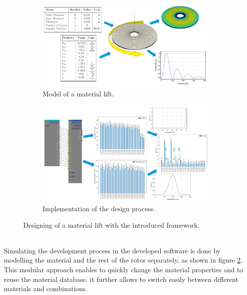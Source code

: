 \begin{figure}[h]
    \centering
    \begin{subfigure}[b]{0.95\textwidth}
        \centering
        \includegraphics[width=\textwidth]{pics/rotor_model.png}
        \caption{\label{pic:rotor_model} Model of a material lift.}
    \end{subfigure}
    \hfill
    \begin{subfigure}[b]{0.95\textwidth}
        \centering
        \includegraphics[width=\textwidth]{pics/rotor_solution.png}
        \caption{\label{pic:rotor_solution} Implementation of the design process.}
    \end{subfigure}
    \caption{\label{pic:rotor} Designing of a material lift with the introduced framework.}
\end{figure}\\
Simulating the development process in the developed software is done by 
modelling the material and the rest of the rotor separately, as shown in figure \ref{pic:rotor_solution}.
This modular approach enables to quickly change the material properties and to reuse the material database.
it further allows to switch easily between different materials and combinations.\\
